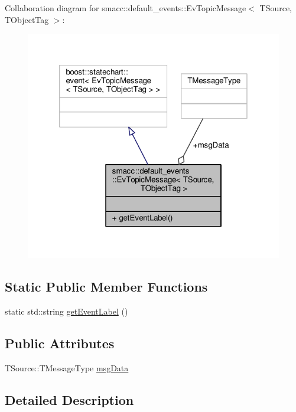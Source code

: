 Collaboration diagram for smacc\+:\+:default\+\_\+events\+:\+:Ev\+Topic\+Message$<$ T\+Source, T\+Object\+Tag $>$\+:\nopagebreak
\begin{figure}[H]
\begin{center}
\leavevmode
\includegraphics[width=320pt]{structsmacc_1_1default__events_1_1EvTopicMessage__coll__graph}
\end{center}
\end{figure}
\subsection*{Static Public Member Functions}
\begin{DoxyCompactItemize}
\item 
static std\+::string \hyperlink{structsmacc_1_1default__events_1_1EvTopicMessage_afaa5fc76f1c6c3eaf30deb8aa58508c0}{get\+Event\+Label} ()
\end{DoxyCompactItemize}
\subsection*{Public Attributes}
\begin{DoxyCompactItemize}
\item 
T\+Source\+::\+T\+Message\+Type \hyperlink{structsmacc_1_1default__events_1_1EvTopicMessage_a82384568b702a0c3a3dc2fbe7eeefea9}{msg\+Data}
\end{DoxyCompactItemize}


\subsection{Detailed Description}
